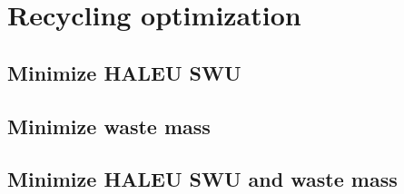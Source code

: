 \section{Recycling optimization}
\subsection{Minimize HALEU SWU}

\subsection{Minimize waste mass}

\subsection{Minimize HALEU SWU and waste mass}
